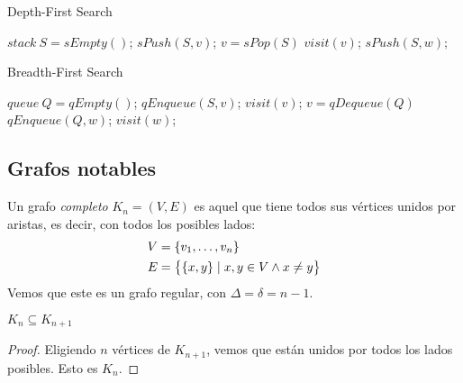 \begin{algorithm}
\caption{Depth-First Search}
\begin{algorithmic}
        \State $stack\ S = sEmpty()$;
        \State $sPush(S,v)$;
            \State $v = sPop(S)$\;
                \State $visit(v)$;
                    \State $sPush(S,w)$;
                \EndFor
            \EndIf
        \EndWhile
    \EndProcedure
\end{algorithmic}
\end{algorithm}

\begin{algorithm}
\caption{Breadth-First Search}
\begin{algorithmic}
        \State $queue\ Q = qEmpty()$;
        \State $qEnqueue(S, v)$;
        \State $visit(v)$;
            \State $v = qDequeue(Q)$\;
                    \State $qEnqueue(Q, w)$;
                    \State $visit(w)$;
                \EndIf
                \EndFor
        \EndWhile
    \EndProcedure
\end{algorithmic}
\end{algorithm}

\subsection{Grafos notables}
\begin{definition}
Un grafo \emph{completo} $K_n = (V,E)$ es aquel que tiene todos sus vértices unidos por aristas, es decir, con todos los posibles lados:
\begin{align}
V &= \left\{v_1,\mathellipsis, v_n\right\}\\
E &= \left\{ \{x,y\} \mid x,y \in V \wedge x\neq y\right\} 
\end{align}
Vemos que este es un grafo regular, con $\Delta = \delta = n-1$.
\end{definition}

\begin{proposition}
$K_n \subseteq K_{n+1}$
\end{proposition}
\begin{proof}
Eligiendo $n$ vértices de $K_{n+1}$, vemos que están unidos por todos los lados posibles. Esto es $K_n$.
\end{proof}

